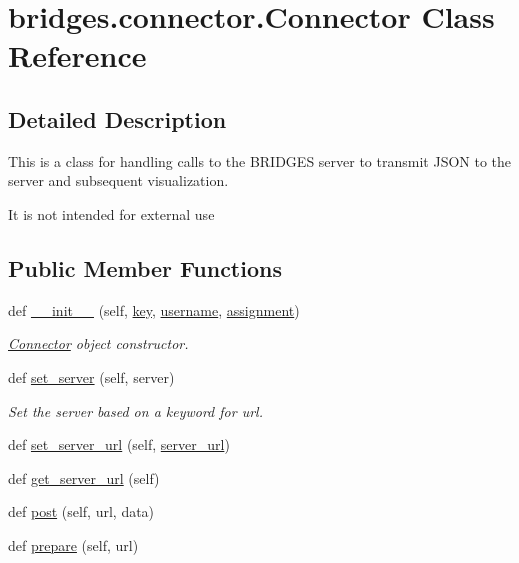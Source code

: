\hypertarget{classbridges_1_1connector_1_1_connector}{}\section{bridges.\+connector.\+Connector Class Reference}
\label{classbridges_1_1connector_1_1_connector}


\subsection{Detailed Description}
This is a class for handling calls to the B\+R\+I\+D\+G\+ES server to transmit J\+S\+ON to the server and subsequent visualization. 

It is not intended for external use \subsection*{Public Member Functions}
\begin{DoxyCompactItemize}
\item 
def \mbox{\hyperlink{classbridges_1_1connector_1_1_connector_a2d5af7535b60c92433f2333951b7ea69}{\+\_\+\+\_\+init\+\_\+\+\_\+}} (self, \mbox{\hyperlink{classbridges_1_1connector_1_1_connector_a3b577c34402fea1910f56fd9cac51c07}{key}}, \mbox{\hyperlink{classbridges_1_1connector_1_1_connector_af2f4f996092cf63a5e7940ca93a2c6b7}{username}}, \mbox{\hyperlink{classbridges_1_1connector_1_1_connector_a2df020c062b6224d4eeb2c5407c02656}{assignment}})
\begin{DoxyCompactList}\small\item\em \mbox{\hyperlink{classbridges_1_1connector_1_1_connector}{Connector}} object constructor. \end{DoxyCompactList}\item 
def \mbox{\hyperlink{classbridges_1_1connector_1_1_connector_aabe66803d7701015138288c5ceeba81f}{set\+\_\+server}} (self, server)
\begin{DoxyCompactList}\small\item\em Set the server based on a keyword for url. \end{DoxyCompactList}\item 
def \mbox{\hyperlink{classbridges_1_1connector_1_1_connector_a6cfa754618584132754cea9a8bde5282}{set\+\_\+server\+\_\+url}} (self, \mbox{\hyperlink{classbridges_1_1connector_1_1_connector_abcc06e345e43916cf975eb200187d911}{server\+\_\+url}})
\item 
def \mbox{\hyperlink{classbridges_1_1connector_1_1_connector_a1db4c60fd9c2817c2ff237bdfb98e4a9}{get\+\_\+server\+\_\+url}} (self)
\item 
def \mbox{\hyperlink{classbridges_1_1connector_1_1_connector_abfc36138302d5ec49219cb3ccf48439a}{post}} (self, url, data)
\item 
def \mbox{\hyperlink{classbridges_1_1connector_1_1_connector_afcd39dd1f2f37a945e16254e0fed178b}{prepare}} (self, url)
\end{DoxyCompactItemize}
